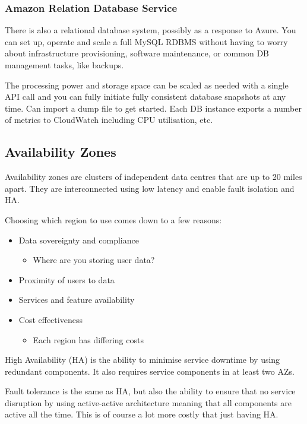 \documentclass[11pt,a4paper,titlepage,dvipsnames,cmyk]{scrartcl}
\begin{document}
\subsubsection{Amazon Relation Database Service}
There is also a relational database system, possibly as a response to Azure. You can set up, operate and scale a full MySQL RDBMS without having to worry about infrastructure provisioning, software maintenance, or common DB management tasks, like backups.

The processing power and storage space can be scaled as needed with a single API call and you can fully initiate fully consistent database snapshots at any time. Can import a dump file to get started. Each DB instance exports a number of metrics to CloudWatch including CPU utilisation, etc.

\subsection{Availability Zones}
Availability zones are clusters of independent data centres that are up to 20 miles apart. They are interconnected using low latency and enable fault isolation and HA.

Choosing which region to use comes down to a few reasons:
\begin{itemize}
    \item Data sovereignty and compliance
    \begin{itemize}
        \item Where are you storing user data?
    \end{itemize}
    \item Proximity of users to data
    \item Services and feature availability
    \item Cost effectiveness
    \begin{itemize}
        \item Each region has differing costs
    \end{itemize}
\end{itemize}

High Availability (HA) is the ability to minimise service downtime by using redundant components. It also requires service components in at least two AZs.

Fault tolerance is the same as HA, but also the ability to ensure that no service disruption by using active-active architecture meaning that all components are active all the time. This is of course a lot more costly that just having HA.
\end{document}
